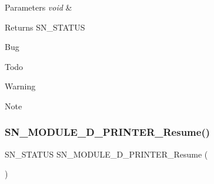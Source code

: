 \begin{DoxyParams}{Parameters}
{\em void} & \\
\hline
\end{DoxyParams}
\begin{DoxyReturn}{Returns}
S\+N\+\_\+\+S\+T\+A\+T\+US 
\end{DoxyReturn}
\begin{DoxyRefDesc}{Bug}
\item[\hyperlink{bug__bug000006}{Bug}]\end{DoxyRefDesc}
\begin{DoxyRefDesc}{Todo}
\item[\hyperlink{todo__todo000006}{Todo}]\end{DoxyRefDesc}
\begin{DoxyWarning}{Warning}

\end{DoxyWarning}
\begin{DoxyNote}{Note}

\end{DoxyNote}
\mbox{\label{group__Module_gaabec8b5f01119d989d725eff26053ca5}} 
\subsubsection{\texorpdfstring{S\+N\+\_\+\+M\+O\+D\+U\+L\+E\+\_\+D\+\_\+\+P\+R\+I\+N\+T\+E\+R\+\_\+\+Resume()}{SN\_MODULE\_3D\_PRINTER\_Resume()}}
{\footnotesize\ttfamily S\+N\+\_\+\+S\+T\+A\+T\+US S\+N\+\_\+\+M\+O\+D\+U\+L\+E\+\_\+D\+\_\+\+P\+R\+I\+N\+T\+E\+R\+\_\+\+Resume (\begin{DoxyParamCaption}\item[{void}]{ }\end{DoxyParamCaption})}


